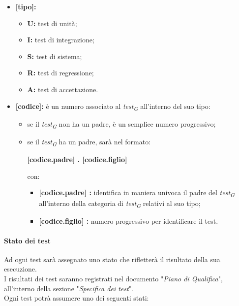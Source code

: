 \begin{itemize}
    \item \textbf{[tipo]:} 
        \begin{itemize}
            \item \textbf{U:} 
                test di unità;
            \item \textbf{I:} 
                test di integrazione;
            \item \textbf{S:} 
                test di sistema;
            \item \textbf{R:} 
                test di regressione;
            \item\textbf{A:} 
                test di accettazione.
        \end{itemize}
    \item \textbf{[codice]:} 
        è un numero associato al \textit{test}\textsubscript{\textit{G}} all'interno del suo tipo: 
        \begin{itemize}
            \item 
                se il \textit{test}\textsubscript{\textit{G}} non ha un padre, è un semplice numero progressivo;
            \item 
                se il \textit{test}\textsubscript{\textit{G}} ha un padre, sarà nel formato:
                \begin{center}
                    \textbf{[codice.padre] . [codice.figlio]} 
                \end{center}
                con:
                \begin{itemize}
                    \item \textbf{[codice.padre] :} 
                        identifica in maniera univoca il padre del \textit{test}\textsubscript{\textit{G}} all'interno della categoria di \textit{test}\textsubscript{\textit{G}} relativi al suo tipo;
                    \item \textbf{[codice.figlio] :} 
                        numero progressivo per identificare il test.
                \end{itemize}
        \end{itemize}
\end{itemize}

\paragraph{Stato dei test}
Ad ogni test sarà assegnato uno stato che rifletterà il risultato della sua esecuzione. \\
I risultati dei test saranno registrati nel documento "\textit{Piano di Qualifica}", all'interno della sezione "\textit{Specifica dei test}". \\
Ogni test potrà assumere uno dei seguenti stati:

